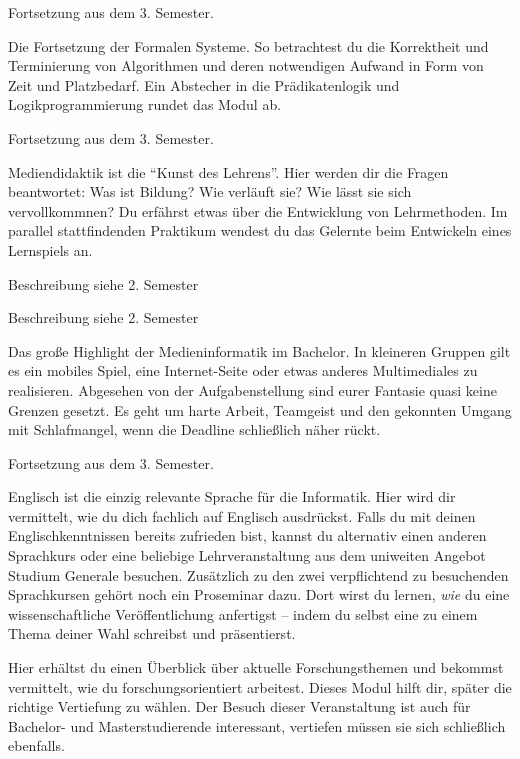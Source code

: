 Fortsetzung aus dem 3. Semester.

Die Fortsetzung der Formalen Systeme.
So betrachtest du die Korrektheit und Terminierung von Algorithmen und deren notwendigen Aufwand in Form von Zeit und Platzbedarf.
Ein Abstecher in die Prädikatenlogik und Logikprogrammierung rundet das Modul ab.

Fortsetzung aus dem 3. Semester.

Mediendidaktik ist die \enquote{Kunst des Lehrens}.
Hier werden dir die Fragen beantwortet:
Was ist Bildung?
Wie verläuft sie?
Wie lässt sie sich vervollkommnen?
Du erfährst etwas über die Entwicklung von Lehrmethoden.
Im parallel stattfindenden Praktikum wendest du das Gelernte beim Entwickeln eines Lernspiels an.

Beschreibung siehe 2. Semester

Beschreibung siehe 2. Semester

Das große Highlight der Medieninformatik im Bachelor.
In kleineren Gruppen gilt es ein mobiles Spiel, eine Internet-Seite oder etwas anderes Multimediales zu realisieren.
Abgesehen von der Aufgabenstellung sind eurer Fantasie quasi keine Grenzen gesetzt.
Es geht um harte Arbeit, Teamgeist und den gekonnten Umgang mit Schlafmangel, wenn die Deadline schließlich näher rückt.

Fortsetzung aus dem 3. Semester.

Englisch ist die einzig relevante Sprache für die Informatik.
Hier wird dir vermittelt, wie du dich fachlich auf Englisch ausdrückst.
Falls du mit deinen Englischkenntnissen bereits zufrieden bist, kannst du alternativ einen anderen Sprachkurs oder eine beliebige Lehrveranstaltung aus dem uniweiten Angebot Studium Generale besuchen.
Zusätzlich zu den zwei verpflichtend zu besuchenden Sprachkursen gehört noch ein Proseminar dazu.
Dort wirst du lernen, \textit{wie} du eine wissenschaftliche Veröffentlichung anfertigst -- indem du selbst eine zu einem Thema deiner Wahl schreibst und präsentierst.

Hier erhältst du einen Überblick über aktuelle Forschungsthemen und bekommst vermittelt, wie du forschungsorientiert arbeitest.
Dieses Modul hilft dir, später die richtige Vertiefung zu wählen. Der Besuch dieser Veranstaltung ist auch für Bachelor- und Masterstudierende interessant, vertiefen müssen sie sich schließlich ebenfalls.

